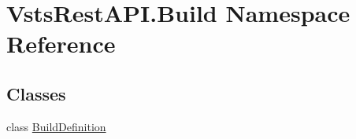\hypertarget{namespace_vsts_rest_a_p_i_1_1_build}{}\section{Vsts\+Rest\+A\+P\+I.\+Build Namespace Reference}
\label{namespace_vsts_rest_a_p_i_1_1_build}
\subsection*{Classes}
\begin{DoxyCompactItemize}
\item 
class \mbox{\hyperlink{class_vsts_rest_a_p_i_1_1_build_1_1_build_definition}{Build\+Definition}}
\end{DoxyCompactItemize}
